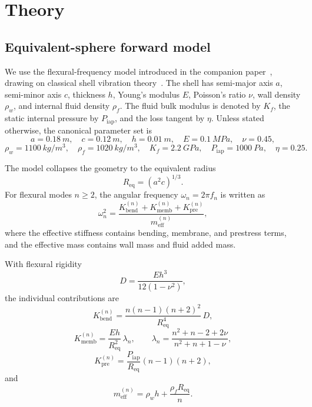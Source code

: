 \section{Theory}\label{sec:theory}

\subsection{Equivalent-sphere forward model}

We use the flexural-frequency model introduced in the companion
paper~\cite{BrowntoneCompanion}, drawing on classical shell vibration
theory~\cite{Soedel2004,Leissa1973}.  The shell has semi-major axis $a$,
semi-minor axis $c$, thickness $h$, Young's modulus $E$, Poisson's ratio $\nu$,
wall density $\rho_w$, and internal fluid density $\rho_f$.  The fluid bulk modulus
is denoted by $K_f$, the static internal pressure by $P_\mathrm{iap}$, and the
loss tangent by $\eta$.  Unless stated otherwise, the canonical parameter set is
\[
a=\SI{0.18}{m},\quad
c=\SI{0.12}{m},\quad
h=\SI{0.01}{m},\quad
E=\SI{0.1}{MPa},\quad
\nu=0.45,
\]
\[
\rho_w=\SI{1100}{kg/m^3},\quad
\rho_f=\SI{1020}{kg/m^3},\quad
K_f=\SI{2.2}{GPa},\quad
P_\mathrm{iap}=\SI{1000}{Pa},\quad
\eta=0.25.
\]

The model collapses the geometry to the equivalent radius
\begin{equation}\label{eq:req}
  R_\mathrm{eq} = (a^2 c)^{1/3}.
\end{equation}
For flexural modes $n \geq 2$, the angular frequency $\omega_n=2\pi f_n$ is
written as
\begin{equation}\label{eq:flexural_forward}
  \omega_n^2
  =
  \frac{K_\mathrm{bend}^{(n)} + K_\mathrm{memb}^{(n)} + K_\mathrm{pre}^{(n)}}
       {m_\mathrm{eff}^{(n)}},
\end{equation}
where the effective stiffness contains bending, membrane, and prestress terms,
and the effective mass contains wall mass and fluid added mass.

With flexural rigidity
\begin{equation}
  D = \frac{E h^3}{12(1-\nu^2)},
\end{equation}
the individual contributions are
\begin{equation}
  K_\mathrm{bend}^{(n)}
  =
  \frac{n(n-1)(n+2)^2}{R_\mathrm{eq}^4}\,D,
\end{equation}
\begin{equation}
  K_\mathrm{memb}^{(n)}
  =
  \frac{E h}{R_\mathrm{eq}^2}\,\lambda_n,
  \qquad
  \lambda_n
  =
  \frac{n^2+n-2+2\nu}{n^2+n+1-\nu},
\end{equation}
\begin{equation}
  K_\mathrm{pre}^{(n)}
  =
  \frac{P_\mathrm{iap}}{R_\mathrm{eq}}(n-1)(n+2),
\end{equation}
and
\begin{equation}
  m_\mathrm{eff}^{(n)}
  =
  \rho_w h + \frac{\rho_f R_\mathrm{eq}}{n}.
\end{equation}

